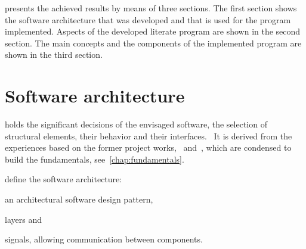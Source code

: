 \documentclass[%
    a4paper,    %
    justified,  %
    nobib,      %
    openany     %
]{tufte-book}
\begin{document}
 presents the achieved results by means of three
sections. The first section shows the software architecture that was developed
and that is used for the program implemented. Aspects of the developed literate
program are shown in the second section. The main concepts and the components of
the implemented program are shown in the third section.

%
%
%


\section{Software architecture}
\label{results:sec:software-architecture}

 holds the significant decisions of the
envisaged software, the selection of structural elements, their behavior and
their interfaces.~\cite{kruchten_rup_2003} It is derived from the experiences
based on the former project works,~
and~, which are condensed to build the
fundamentals, see~\ref{chap:fundamentals}.

 define the software architecture:
\begin{enumerate*}
  \item an architectural software design pattern,
  \item layers and
  \item signals, allowing communication between components.
\end{enumerate*}
\end{document}
